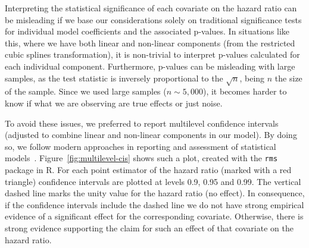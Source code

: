 \documentclass{chi2012}
\begin{document}
Interpreting the statistical significance of each covariate on the hazard ratio can be misleading if we base our considerations solely on traditional significance tests for individual model coefficients and the associated p-values. In situations like this, where
we have both linear and non-linear components (from the restricted cubic splines transformation), it is non-trivial to interpret p-values calculated for each individual component. Furthermore, p-values can be misleading with large samples, as the test statistic is inversely proportional to the $\sqrt{n}$, being $n$ the size of the sample. Since we used large samples ($n \sim 5,000$), it becomes harder to know if what we are observing are true effects or just noise.

To avoid these issues, we preferred to report multilevel confidence intervals (adjusted to combine linear and non-linear components in our model). By doing so, we follow modern approaches in reporting and assessment of statistical models~\cite{cumming2013}.
Figure~\ref{fig:multilevel-cis} shows such a plot, created with the \texttt{rms}
package in R. For each point estimator of the hazard ratio (marked with a red
triangle) confidence intervals are plotted at levels 0.9, 0.95 and 0.99. The
vertical dashed line marks the unity value for the hazard ratio (no effect).
In consequence, if the confidence intervals include the dashed line we do not
have strong empirical evidence of a significant effect for the corresponding
covariate. Otherwise, there is strong evidence supporting the claim for such
an effect of that covariate on the hazard ratio.

\begin{figure*}
\vspace{-1cm}
\centering
{}
\hspace{0mm}
\hspace{0mm}
\hspace{0mm}
\caption{Estimated hazard ratios and multilevel confidence intervals at 90\% (dark blue),
95\% (blue) and 99\% (light blue) for model covariates in each site. 
Hazard ratios are calculated between the lower and upper 
limits of the interquartile range (continuous variables) or comparing between 
levels (categorical variables), as indicated next to the label of each covariate.}
\label{fig:multilevel-cis}
\end{figure*}
\end{document}
